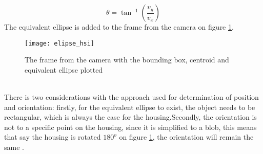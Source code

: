 \begin{equation}
\theta = \tan^{-1}\left(\frac{v_y}{v_x}\right)
\end{equation}   
The equivalent ellipse is added to the frame from the camera on figure \ref{fig_ellipse}.
\begin{figure}[htbp!]
	\centering
	\texttt{[image: elipse\_hsi]}
	\caption{The frame from the camera with the bounding box, centroid and equivalent ellipse plotted}
	\label{fig_ellipse}
\end{figure}\\
There is two considerations with the approach used for determination of position and orientation: firstly, for the equivalent ellipse to exist, the object needs to be rectangular, which is always the case for the housing.Secondly, the orientation is not to a specific  point on the housing, since it is simplified to a blob, this means that say the housing is rotated $180^o$ on figure \ref{fig_ellipse}, the orientation will remain the same .  
\begin{figure}

\end{figure}
